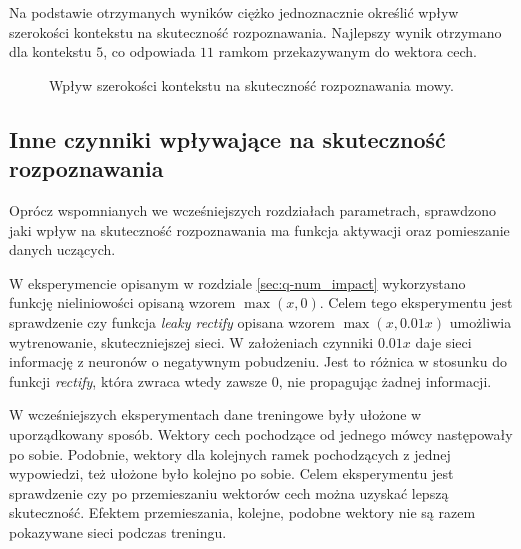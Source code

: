 \documentclass[11pt]{article}
\begin{document}
		Na podstawie otrzymanych wyników ciężko jednoznacznie określić wpływ szerokości kontekstu na skuteczność rozpoznawania. Najlepszy wynik otrzymano dla kontekstu $5$, co odpowiada $11$ ramkom przekazywanym do wektora cech.
		
		\begin{figure}[H]
			\centering
			\label{fig:fig_ctx_impact}
			\caption{Wpływ szerokości kontekstu na skuteczność rozpoznawania mowy.}
		\end{figure}

	\subsection{ Inne czynniki wpływające na skuteczność rozpoznawania }
		Oprócz wspomnianych we wcześniejszych rozdziałach parametrach, sprawdzono jaki wpływ na skuteczność rozpoznawania ma funkcja aktywacji oraz pomieszanie danych uczących. 
		
		W eksperymencie opisanym w rozdziale \ref{sec:q-num_impact} wykorzystano funkcję nieliniowości opisaną wzorem $\max(x,0)$. Celem tego eksperymentu jest sprawdzenie czy funkcja \textit{leaky rectify} opisana wzorem $\max(x, 0.01x)$ umożliwia wytrenowanie, skuteczniejszej sieci. W założeniach czynniki $0.01x$ daje sieci informację z neuronów o negatywnym pobudzeniu. Jest to różnica w stosunku do funkcji \textit{rectify}, która zwraca wtedy zawsze $0$, nie propagując żadnej informacji. 
		
		W wcześniejszych eksperymentach dane treningowe były ułożone w uporządkowany sposób. Wektory cech pochodzące od jednego mówcy następowały po sobie. Podobnie, wektory dla kolejnych ramek pochodzących z jednej wypowiedzi, też  ułożone było kolejno po sobie. Celem eksperymentu jest sprawdzenie czy po przemieszaniu wektorów cech można uzyskać lepszą skuteczność. Efektem przemieszania, kolejne, podobne wektory nie są razem pokazywane sieci podczas treningu.
		
\end{document}
